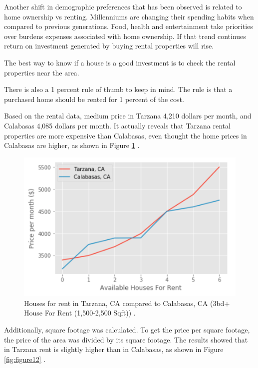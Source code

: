 \documentclass[sigconf]{acmart}
\begin{document}
Another shift in demographic preferences that has been observed is related to home ownership vs renting.  Millenniums are changing their spending habits when compared to previous generations. Food, health and entertainment take priorities over burdens expenses associated with home ownership.  If that trend continues return on investment generated by buying rental properties will rise.

The best way to know if a house is a good investment is to check the rental properties near the area.

There is also a 1 percent rule of thumb to keep in mind. The rule is that a purchased home should be rented for 1 percent of the cost.

Based on the rental data, medium price in Tarzana 4,210 dollars per month, and Calabasas 4,085 dollars per month. It actually reveals that Tarzana rental properties are more expensive than Calabasas, even thought the home prices in Calabasas are higher, as shown in Figure \ref{fig:figure11} \cite{md}.

\begin{figure}
  \centering
  \includegraphics[width=1.0\columnwidth]{images/figure11.png}
  \caption{Houses for rent in Tarzana, CA compared to Calabasas, CA (3bd+ House For Rent (1,500-2,500 Sqft)) \cite{md}.} \label{fig:figure11} 
\end{figure}

Additionally, square footage was calculated. To get the price per square footage, the price of the area was divided by its square footage. The results showed that in Tarzana rent is slightly higher than in Calabasas, as shown in Figure \ref{fig:figure12} \cite{md}.
\end{document}
